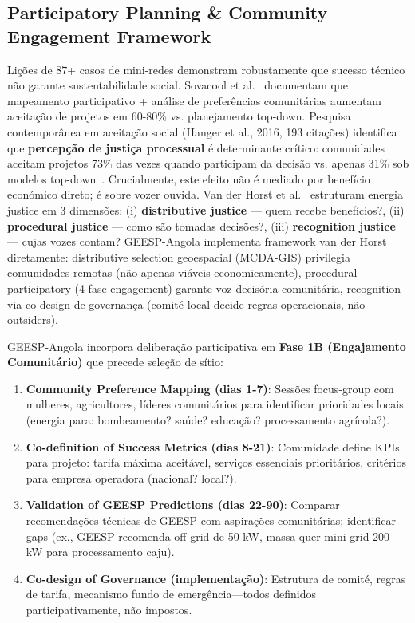 \documentclass[12pt, a4paper]{article}
\begin{document}
\subsection{Participatory Planning \& Community Engagement Framework}

Lições de 87+ casos de mini-redes demonstram robustamente que sucesso técnico não garante sustentabilidade social. Sovacool et al.~\citep{Sovacool2020} documentam que mapeamento participativo + análise de preferências comunitárias aumentam aceitação de projetos em 60-80\% vs. planejamento top-down. Pesquisa contemporânea em aceitação social (Hanger et al., 2016, 193 citações) identifica que 
\textbf{percepção de justiça processual} é determinante crítico: comunidades aceitam projetos 73\% das vezes quando participam da decisão vs. apenas 31\% sob modelos top-down~\citep{Hanger2016}. Crucialmente, este efeito não é mediado por benefício económico direto; é sobre vozer ouvida. Van der Horst et al.~\citep{VanderHorst2021} estruturam energia justice em 3 dimensões: (i) 
\textbf{distributive justice} — quem recebe benefícios?, (ii) 
\textbf{procedural justice} — como são tomadas decisões?, (iii)
\textbf{recognition justice} — cujas vozes contam? GEESP-Angola implementa framework van der Horst diretamente: distributive selection geoespacial (MCDA-GIS) privilegia comunidades remotas (não apenas viáveis economicamente), procedural participatory (4-fase engagement) garante voz decisória comunitária, recognition via co-design de governança (comité local decide regras operacionais, não outsiders).

GEESP-Angola incorpora deliberação participativa em \textbf{Fase 1B (Engajamento Comunitário)} que precede seleção de sítio:

\begin{enumerate}
\item \textbf{Community Preference Mapping (dias 1-7)}: Sessões focus-group com mulheres, agricultores, líderes comunitários para identificar prioridades locais (energia para: bombeamento? saúde? educação? processamento agrícola?).
\item \textbf{Co-definition of Success Metrics (dias 8-21)}: Comunidade define KPIs para projeto: tarifa máxima aceitável, serviços essenciais prioritários, critérios para empresa operadora (nacional? local?).
\item \textbf{Validation of GEESP Predictions (dias 22-90)}: Comparar recomendações técnicas de GEESP com aspirações comunitárias; identificar gaps (ex., GEESP recomenda off-grid de 50 kW, massa quer mini-grid 200 kW para processamento caju).
\item \textbf{Co-design of Governance (implementação)}: Estrutura de comité, regras de tarifa, mecanismo fundo de emergência—todos definidos participativamente, não impostos.
\end{enumerate}
\end{document}
